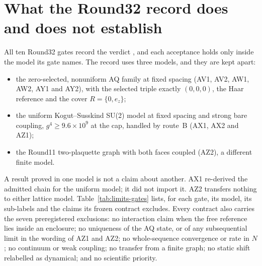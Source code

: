 \section{What the Round32 record does and does not establish}
\label{sec:limits}

All ten Round32 gates record the verdict , and
each acceptance holds only inside the model its gate names. The record uses
three models, and they are kept apart:
\begin{itemize}
\item the zero-selected, nonuniform AQ family at fixed spacing (AV1, AV2, AW1,
 AW2, AY1 and AY2), with the selected triple exactly $(0,0,0)$, the Haar
 reference and the cover $R=\{0,e_z\}$;
\item the uniform Kogut--Susskind SU(2) model at fixed spacing and strong bare
 coupling, $g^4\ge9.6\times10^9$ at the cap, handled by route~B (AX1, AX2 and
 AZ1);
\item the Round11 two-plaquette graph with both faces coupled (AZ2), a
 different finite model.
\end{itemize}
A result proved in one model is not a claim about another. AX1 re-derived
the admitted chain for the uniform model; it did not import it. AZ2 transfers
nothing to either lattice model. Table~\ref{tab:limits-gates} lists, for each
gate, its model, its sub-labels and the claims its frozen contract excludes.
Every contract also carries the seven preregistered exclusions: no
interaction claim when the free reference lies inside an enclosure; no
uniqueness of the AQ state, or of any subsequential limit in the wording of
AZ1 and AZ2; no whole-sequence convergence or rate in $N$; no continuum or
weak coupling; no transfer from a finite graph; no static shift relabelled
as dynamical; and no scientific priority.

